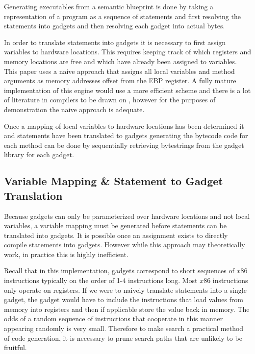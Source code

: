     Generating executables from a semantic blueprint is done by taking a
    representation of a program as a sequence of statements and first resolving
    the statements into gadgets and then resolving each gadget into actual
    bytes.

    In order to translate statements into gadgets it is necessary to first
    assign variables to hardware locations. This requires keeping track of which
    registers and memory locations are free and which have already been assigned
    to variables. This paper uses a naive approach that assigns all local
    variables and method arguments as memory addresses offset from the EBP
    register. A fully mature implementation of this engine would use a more
    efficient scheme and there is a lot of literature in compilers to be drawn
    on \cite{COMPILER-REGISTER-MAPPING}, however for the purposes of
    demonstration the naive approach is adequate.


    Once a mapping of local variables to hardware locations has been determined
    it and statements have been translated to gadgets generating the bytecode
    code for each method can be done by sequentially retrieving bytestrings
    from the gadget library for each gadget. 

    \subsection{Variable Mapping \& Statement to Gadget Translation}

    Because gadgets can only be parameterized over hardware locations and not
    local variables, a variable mapping must be generated before statements can
    be translated into gadgets. It is possible once an assignment exists to
    directly compile statements into gadgets. However while this approach may
    theoretically work, in practice this is highly inefficient.
    

    Recall that in this implementation, gadgets correspond to short sequences of
    $x86$ instructions typically on the order of 1-4 instructions long. Most
    $x86$ instructions only operate on registers. If we were to naively
    translate statements into a single gadget, the gadget would have to include
    the instructions that load values from memory into registers and then if
    applicable store the value back in memory. The odds of a random sequence of
    instructions that cooperate in this manner appearing randomly is very
    small. Therefore to make search a practical method of code generation, it is
    necessary to prune search paths that are unlikely to be fruitful.

